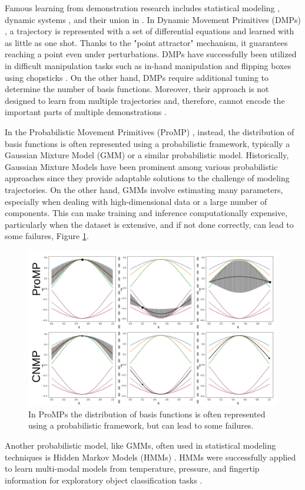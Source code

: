Famous learning from demonstration research includes statistical modeling \cite{calinon2016tutorial}, dynamic systems \cite{schaal2006dynamic}, and their union in \cite{ugur2020compliant}. In Dynamic Movement Primitives (DMPs) \cite{schaal2006dynamic}, a trajectory is represented with a set of differential equations and learned with as little as one shot. Thanks to the "point attractor" mechanism, it guarantees reaching a point even under perturbations. DMPs have successfully been utilized in difficult manipulation tasks such as in-hand manipulation and flipping boxes using chopsticks \cite{pastor2009learning}. On the other hand, DMPs require additional tuning to determine the number of basis functions. Moreover, their approach is not designed to learn from multiple trajectories and, therefore, cannot encode the important parts of multiple demonstrations \cite{Ugur-RSS-19}. 

In the Probabilistic Movement Primitives (ProMP) \cite{paraschos2013probabilistic}, instead, the distribution of basis functions is often represented using a probabilistic framework, typically a Gaussian Mixture Model (GMM) or a similar probabilistic model. Historically, Gaussian Mixture Models \cite{nguyen2009model} have been prominent among various probabilistic approaches since they provide adaptable solutions to the challenge of modeling trajectories. On the other hand, GMMs involve estimating many parameters, especially when dealing with high-dimensional data or a large number of components. This can make training and inference computationally expensive, particularly when the dataset is extensive, and if not done correctly, can lead to some failures, Figure \ref{fig:prompcnmp}.
\begin{figure}
	\centering
	\includegraphics[width=0.5\linewidth]{Images/ProMPvsCNMP.png}
	\caption{In ProMPs the distribution of basis functions is often represented using a probabilistic framework, but can lead to some failures.}
	\label{fig:prompcnmp}
\end{figure}

Another probabilistic model, like GMMs, often used in statistical modeling techniques is Hidden Markov Models (HMMs) \cite{lee2011incremental}. HMMs were successfully applied to learn multi-modal models from temperature, pressure, and fingertip information for exploratory object classification tasks \cite{chu2013using}.

